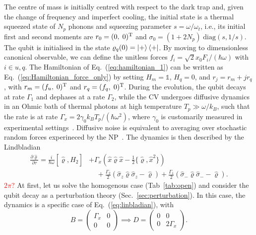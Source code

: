 \documentclass[%
reprint,
superscriptaddress,
nofootinbib,
 amsmath,amssymb,
prx,
floatfix,
]{revtex4-2}
\begin{document}
  The centre of mass is initially centred with respect to the dark trap and, given the change of frequency and imperfect cooling, the initial state is a thermal squeezed state of $N_p$ phonons and squeezing parameter $s = \omega/\omega_t$, i.e., its initial first and second moments are $r_0 = (0,\; 0)^{\rm T}$ and $\sigma_0 = (1+2N_p) \;\text{diag}(s,1/s)$. The qubit is initialised in the state $\varrho_q (0) = \ket{+}\bra{+}$.
By moving to dimensionless canonical observable, we can define the unitless forces $f_i = \sqrt{2} x_0 F_i/(\hbar \omega)$ with $i \in u, q$. The Hamiltonian of Eq.~(\ref{eq:hamiltonian_1}) can be written as  Eq.~(\ref{eq:Hamiltonian_force_only})  by setting $H_m = \mathds{1}$, $H_q = 0$, and $r_j = r_m + j r_q$, with $r_m=(f_u,\;0)^{\rm T}$ and $r_q = (f_q, \; 0)^{\rm T}$. During the evolution,  the qubit decays at rate $\Gamma_1$ and dephases at a rate $\Gamma_2$, while the CV undergoes diffusive dynamics in an Ohmic bath of thermal photons at high temperature $T_{p} \gg \omega/k_B$, such that the rate is at rate $\Gamma_x = 2 \gamma_0 k_B T_p/(\hbar \omega^2)$, where $\gamma_0$ is customarily measured in experimental settings~\cite{schlosshauer_quantum_2007}. Diffusive noise is equivalent to averaging over stochastic random forces experineced by the NP~\cite{weiss_large_2021}. The dynamics is then described by the Lindbladian 
\begin{align}
    \frac{\partial \hat{\varrho}}{\partial \tau} =  \frac{i}{\hbar \omega} [ \hat{\varrho}, \hat{H}_{2}] &+ \Gamma_x \left(  \hat{x} \hat{\varrho} \hat{x}  - \frac{1}{2} \{ \hat{\varrho}, \hat{x}^2 \} \right)  \\
    &\;\;\;\; + \frac{\Gamma_2}{2} \left(\hat{\sigma}_z \hat{\varrho} \hat{\sigma}_z  - \hat{\varrho} \right) + \frac{\Gamma_1}{2} \left(\hat{\sigma}_- \hat{\varrho} \hat{\sigma}_-  - \hat{\varrho} \right). \nonumber
\end{align}
\textcolor{red}{$2 \pi$?}
At first, let us solve the homogenous case (Tab~\ref{tab:open}) and consider the qubit decay as a perturbation theory (Sec.~\ref{sec:perturbation}). In this case, the dynamics is a specific case of Eq.~(\ref{eq:linbladian}), with 
\begin{equation}
    B = \begin{pmatrix}
         \Gamma_x &0\\
        0&0
    \end{pmatrix} \implies  D =  \begin{pmatrix}
        0 & 0\\
        0 &  2 \Gamma_x
    \end{pmatrix} .
\end{equation}
\end{document}
